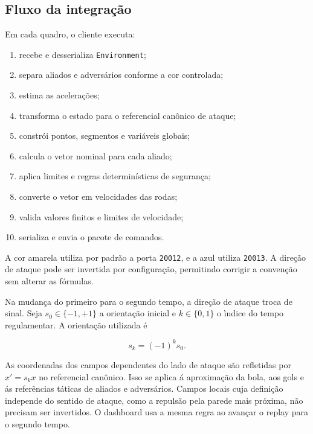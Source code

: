 \documentclass[12pt,a4paper]{article}
\begin{document}
\subsection{Fluxo da integra\c{c}\~ao}

Em cada quadro, o cliente executa:

\begin{enumerate}
  \item recebe e desserializa \texttt{Environment};
  \item separa aliados e advers\'arios conforme a cor controlada;
  \item estima as acelera\c{c}\~oes;
  \item transforma o estado para o referencial can\^onico de ataque;
  \item constr\'oi pontos, segmentos e vari\'aveis globais;
  \item calcula o vetor nominal para cada aliado;
  \item aplica limites e regras determin\'isticas de seguran\c{c}a;
  \item converte o vetor em velocidades das rodas;
  \item valida valores finitos e limites de velocidade;
  \item serializa e envia o pacote de comandos.
\end{enumerate}

A cor amarela utiliza por padr\~ao a porta \texttt{20012}, e a azul utiliza \texttt{20013}. A dire\c{c}\~ao de ataque pode ser invertida por configura\c{c}\~ao, permitindo corrigir a conven\c{c}\~ao sem alterar as f\'ormulas.

Na mudan\c{c}a do primeiro para o segundo tempo, a dire\c{c}\~ao de ataque troca de sinal. Seja $s_0\in\{-1,+1\}$ a orienta\c{c}\~ao inicial e $k\in\{0,1\}$ o \`indice do tempo regulamentar. A orienta\c{c}\~ao utilizada \'e

\begin{equation}
  s_k=(-1)^k s_0.
\end{equation}

As coordenadas dos campos dependentes do lado de ataque s\~ao refletidas por $x'=s_kx$ no referencial can\^onico. Isso se aplica \'a aproxima\c{c}\~ao da bola, aos gols e \'as refer\^encias t\'aticas de aliados e advers\'arios. Campos locais cuja defini\c{c}\~ao independe do sentido de ataque, como a repuls\~ao pela parede mais pr\'oxima, n\~ao precisam ser invertidos. O dashboard usa a mesma regra ao avan\c{c}ar o replay para o segundo tempo.
\end{document}
